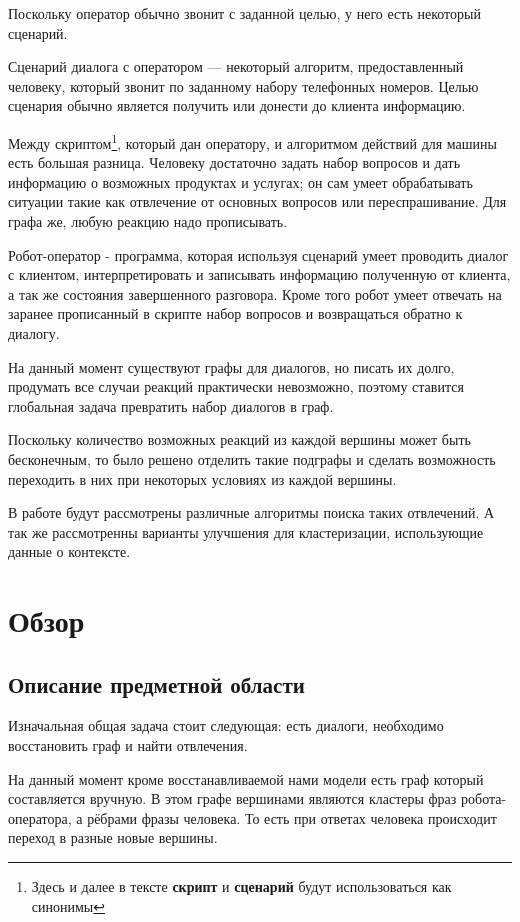 \documentclass[specification,annotation]{itmo-student-thesis}
\begin{document}
	Поскольку оператор обычно звонит с заданной целью, у него есть некоторый сценарий.
	
	Сценарий диалога с оператором — некоторый алгоритм, предоставленный человеку, который звонит по заданному набору телефонных номеров. Целью сценария обычно является получить или донести до клиента информацию. 
	
	Между скриптом\footnote{Здесь и далее в тексте \textbf{скрипт} и \textbf{сценарий} будут использоваться как синонимы}, который дан оператору, и алгоритмом действий для машины есть большая разница. Человеку достаточно задать набор вопросов и дать информацию о возможных продуктах и услугах; он сам умеет обрабатывать ситуации такие как отвлечение от основных вопросов или переспрашивание. Для графа же, любую реакцию надо прописывать.
	
	Робот-оператор - программа, которая используя сценарий умеет проводить диалог с клиентом, интерпретировать и записывать  информацию полученную от клиента, а так же состояния завершенного разговора. Кроме того робот умеет отвечать на заранее прописанный в скрипте набор вопросов и возвращаться обратно к диалогу.
	
	На данный момент существуют графы для диалогов, но писать их долго, продумать все случаи реакций практически невозможно, поэтому ставится глобальная задача превратить набор диалогов в граф. 
	
	Поскольку количество возможных реакций из каждой вершины может быть бесконечным, то было решено отделить такие подграфы и сделать возможность переходить в них при некоторых условиях из каждой вершины.
	
	В работе будут рассмотрены различные алгоритмы поиска таких отвлечений. А так же рассмотренны варианты улучшения для кластеризации, использующие данные о контексте.
	
	\chapter{Обзор}
	\section{Описание предметной области}
	Изначальная общая задача стоит следующая: есть диалоги, необходимо восстановить граф и найти отвлечения.
	
	На данный момент кроме восстанавливаемой нами модели есть граф который составляется вручную. В этом графе вершинами являются кластеры фраз робота-оператора, а рёбрами фразы человека. То есть при ответах человека происходит переход в разные новые вершины.
	
\end{document}
